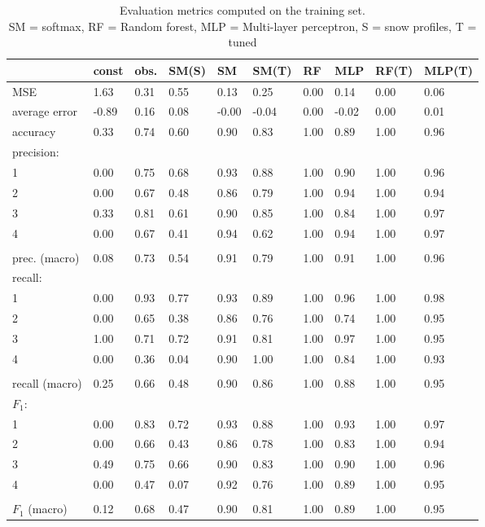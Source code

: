 \begin{table}[H]
\caption{Evaluation metrics computed on the training set. \\ SM = softmax, RF = Random forest, MLP = Multi-layer perceptron, S = snow profiles, T = tuned}
\label{tbl:sais_eval_training}
\begin{tabular}{llllllllll}
\toprule
 & const  & obs.   & SM(S) & SM     & SM(T) & RF     & MLP    & RF(T)  & MLP(T) \\
\midrule
MSE & 1.63 & 0.31 & 0.55 & 0.13 & 0.25 & 0.00 & 0.14 & 0.00 & 0.06 \\
average error & -0.89 & 0.16 & 0.08 & -0.00 & -0.04 & 0.00 & -0.02 & 0.00 & 0.01 \\
accuracy & 0.33 & 0.74 & 0.60 & 0.90 & 0.83 & 1.00 & 0.89 & 1.00 & 0.96 \\
precision: &  &  &  &  &  &  &  &  &  \\
1  & 0.00 & 0.75 & 0.68 & 0.93 & 0.88 & 1.00 & 0.90 & 1.00 & 0.96 \\
2   & 0.00 & 0.67 & 0.48 & 0.86 & 0.79 & 1.00 & 0.94 & 1.00 & 0.94 \\
3    & 0.33 & 0.81 & 0.61 & 0.90 & 0.85 & 1.00 & 0.84 & 1.00 & 0.97 \\
4     & 0.00 & 0.67 & 0.41 & 0.94 & 0.62 & 1.00 & 0.94 & 1.00 & 0.97 \\
     &  &  &  &  &  &  &  &  &  \\
prec. (macro) & 0.08 & 0.73 & 0.54 & 0.91 & 0.79 & 1.00 & 0.91 & 1.00 & 0.96 \\
recall: &  &  &  &  &  &  &  &  &  \\
1      & 0.00 & 0.93 & 0.77 & 0.93 & 0.89 & 1.00 & 0.96 & 1.00 & 0.98 \\
2       & 0.00 & 0.65 & 0.38 & 0.86 & 0.76 & 1.00 & 0.74 & 1.00 & 0.95 \\
3        & 1.00 & 0.71 & 0.72 & 0.91 & 0.81 & 1.00 & 0.97 & 1.00 & 0.95 \\
4         & 0.00 & 0.36 & 0.04 & 0.90 & 1.00 & 1.00 & 0.84 & 1.00 & 0.93 \\
         &  &  &  &  &  &  &  &  &  \\
recall (macro) & 0.25 & 0.66 & 0.48 & 0.90 & 0.86 & 1.00 & 0.88 & 1.00 & 0.95 \\
$F_1$: &  &  &  &  &  &  &  &  &  \\
1          & 0.00 & 0.83 & 0.72 & 0.93 & 0.88 & 1.00 & 0.93 & 1.00 & 0.97 \\
2           & 0.00 & 0.66 & 0.43 & 0.86 & 0.78 & 1.00 & 0.83 & 1.00 & 0.94 \\
3            & 0.49 & 0.75 & 0.66 & 0.90 & 0.83 & 1.00 & 0.90 & 1.00 & 0.96 \\
4             & 0.00 & 0.47 & 0.07 & 0.92 & 0.76 & 1.00 & 0.89 & 1.00 & 0.95 \\
             &  &  &  &  &  &  &  &  &  \\
$F_1$ (macro) & 0.12 & 0.68 & 0.47 & 0.90 & 0.81 & 1.00 & 0.89 & 1.00 & 0.95 \\
\bottomrule
\end{tabular}
\end{table}
